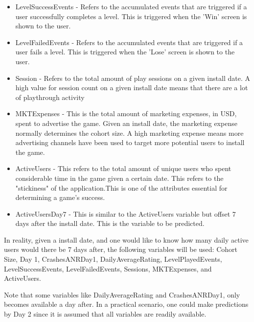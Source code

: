 \begin{itemize}
\item LevelSuccessEvents - Refers to the accumulated events that are triggered if a user successfully completes a level. This is triggered when the 'Win' screen is shown to the user.
\item LevelFailedEvents - Refers to the accumulated events that are triggered if a user fails a level. This is triggered when the 'Lose' screen is shown to the user.
\item Session - Refers to the total amount of play sessions on a given install date. A high value for session count on a given install date means that there are a lot of playthrough activity 
\item MKTExpenses - This is the total amount of marketing expenses, in USD, spent to advertise the game. Given an install date, the marketing expense normally determines the cohort size. A high marketing expense means more advertising channels have been used to target more potential users to install the game.
\item ActiveUsers - This refers to the total amount of unique users who spent considerable time in the game given a certain date. This refers to the "stickiness" of the application.This is one of the attributes essential for determining a game's success.
\item ActiveUsersDay7 - This is similar to the ActiveUsers variable but offset 7 days after the install date. This is the variable to be predicted. 
\end{itemize}

In reality, given a install date, and one would like to know how many daily active users would there be 7 days after, the following variables will be used: Cohort Size, Day 1, CrashesANRDay1, DailyAverageRating, LevelPlayedEvents, LevelSuccessEvents, LevelFailedEvents, Sessions, MKTExpenses, and ActiveUsers.

Note that some variables like DailyAverageRating and CrashesANRDay1, only becomes available a day after. In a practical scenario, one could make predictions by Day 2 since it is assumed that all variables are readily available.